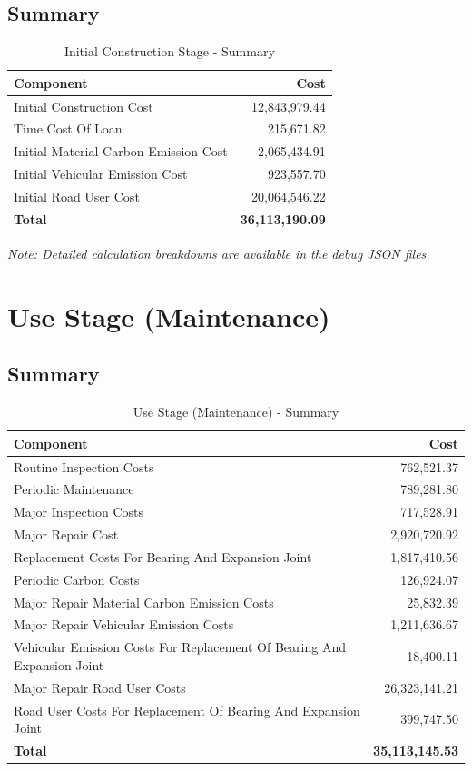 \documentclass[12pt,a4paper]{article}
\begin{document}
\subsection{Summary}

\begin{table}[H]
\centering
\begin{tabular}{lr}
\toprule
\textbf{Component} & \textbf{Cost} \\
\midrule
Initial Construction Cost & 12,843,979.44 \\
Time Cost Of Loan & 215,671.82 \\
Initial Material Carbon Emission Cost & 2,065,434.91 \\
Initial Vehicular Emission Cost & 923,557.70 \\
Initial Road User Cost & 20,064,546.22 \\
\midrule
\textbf{Total} & \textbf{36,113,190.09} \\
\bottomrule
\end{tabular}
\caption{Initial Construction Stage - Summary}
\end{table}

\textit{Note: Detailed calculation breakdowns are available in the debug JSON files.}

\section{Use Stage (Maintenance)}

\subsection{Summary}

\begin{table}[H]
\centering
\begin{tabular}{lr}
\toprule
\textbf{Component} & \textbf{Cost} \\
\midrule
Routine Inspection Costs & 762,521.37 \\
Periodic Maintenance & 789,281.80 \\
Major Inspection Costs & 717,528.91 \\
Major Repair Cost & 2,920,720.92 \\
Replacement Costs For Bearing And Expansion Joint & 1,817,410.56 \\
Periodic Carbon Costs & 126,924.07 \\
Major Repair Material Carbon Emission Costs & 25,832.39 \\
Major Repair Vehicular Emission Costs & 1,211,636.67 \\
Vehicular Emission Costs For Replacement Of Bearing And Expansion Joint & 18,400.11 \\
Major Repair Road User Costs & 26,323,141.21 \\
Road User Costs For Replacement Of Bearing And Expansion Joint & 399,747.50 \\
\midrule
\textbf{Total} & \textbf{35,113,145.53} \\
\bottomrule
\end{tabular}
\caption{Use Stage (Maintenance) - Summary}
\end{table}
\end{document}
